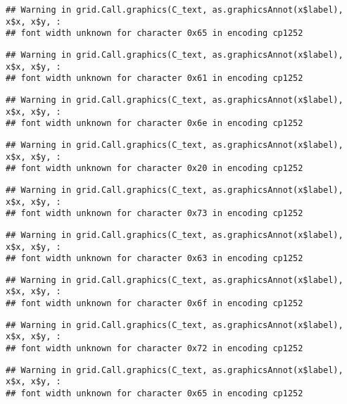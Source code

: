 \documentclass[
]{article}
\begin{document}
\begin{verbatim}
## Warning in grid.Call.graphics(C_text, as.graphicsAnnot(x$label), x$x, x$y, :
## font width unknown for character 0x65 in encoding cp1252
\end{verbatim}

\begin{verbatim}
## Warning in grid.Call.graphics(C_text, as.graphicsAnnot(x$label), x$x, x$y, :
## font width unknown for character 0x61 in encoding cp1252
\end{verbatim}

\begin{verbatim}
## Warning in grid.Call.graphics(C_text, as.graphicsAnnot(x$label), x$x, x$y, :
## font width unknown for character 0x6e in encoding cp1252
\end{verbatim}

\begin{verbatim}
## Warning in grid.Call.graphics(C_text, as.graphicsAnnot(x$label), x$x, x$y, :
## font width unknown for character 0x20 in encoding cp1252
\end{verbatim}

\begin{verbatim}
## Warning in grid.Call.graphics(C_text, as.graphicsAnnot(x$label), x$x, x$y, :
## font width unknown for character 0x73 in encoding cp1252
\end{verbatim}

\begin{verbatim}
## Warning in grid.Call.graphics(C_text, as.graphicsAnnot(x$label), x$x, x$y, :
## font width unknown for character 0x63 in encoding cp1252
\end{verbatim}

\begin{verbatim}
## Warning in grid.Call.graphics(C_text, as.graphicsAnnot(x$label), x$x, x$y, :
## font width unknown for character 0x6f in encoding cp1252
\end{verbatim}

\begin{verbatim}
## Warning in grid.Call.graphics(C_text, as.graphicsAnnot(x$label), x$x, x$y, :
## font width unknown for character 0x72 in encoding cp1252
\end{verbatim}

\begin{verbatim}
## Warning in grid.Call.graphics(C_text, as.graphicsAnnot(x$label), x$x, x$y, :
## font width unknown for character 0x65 in encoding cp1252
\end{verbatim}
\end{document}
